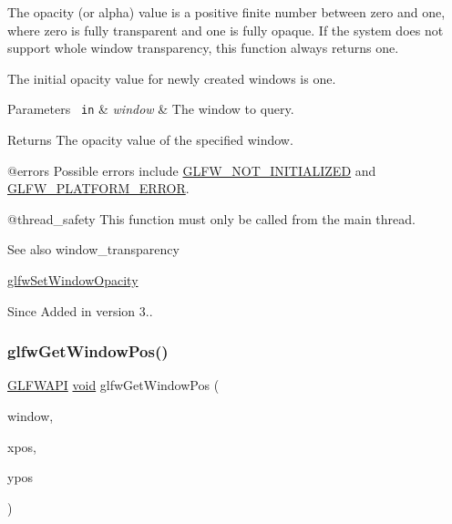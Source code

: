 The opacity (or alpha) value is a positive finite number between zero and one, where zero is fully transparent and one is fully opaque. If the system does not support whole window transparency, this function always returns one.

The initial opacity value for newly created windows is one.


\begin{DoxyParams}[1]{Parameters}
\mbox{\texttt{ in}}  & {\em window} & The window to query. \\
\hline
\end{DoxyParams}
\begin{DoxyReturn}{Returns}
The opacity value of the specified window.
\end{DoxyReturn}
@errors Possible errors include \mbox{\hyperlink{group__errors_ga2374ee02c177f12e1fa76ff3ed15e14a}{G\+L\+F\+W\+\_\+\+N\+O\+T\+\_\+\+I\+N\+I\+T\+I\+A\+L\+I\+Z\+ED}} and \mbox{\hyperlink{group__errors_gad44162d78100ea5e87cdd38426b8c7a1}{G\+L\+F\+W\+\_\+\+P\+L\+A\+T\+F\+O\+R\+M\+\_\+\+E\+R\+R\+OR}}.

@thread\+\_\+safety This function must only be called from the main thread.

\begin{DoxySeeAlso}{See also}
window\+\_\+transparency 

\mbox{\hyperlink{group__window_ga62a784fe328f227727cbcd0d07480ff3}{glfw\+Set\+Window\+Opacity}}
\end{DoxySeeAlso}
\begin{DoxySince}{Since}
Added in version 3.. 
\end{DoxySince}
\mbox{\label{group__window_ga0076a8591ef7494d359730cf2250b45b}} 
\subsubsection{\texorpdfstring{glfwGetWindowPos()}{glfwGetWindowPos()}}
{\footnotesize\ttfamily \mbox{\hyperlink{glfw3_8h_a56da5036b2cc259351ae22fd6439bb47}{G\+L\+F\+W\+A\+PI}} \mbox{\hyperlink{glad_8h_a950fc91edb4504f62f1c577bf4727c29}{void}} glfw\+Get\+Window\+Pos (\begin{DoxyParamCaption}\item[{\mbox{\hyperlink{group__window_ga3c96d80d363e67d13a41b5d1821f3242}{G\+L\+F\+Wwindow}} $\ast$}]{window,  }\item[{int $\ast$}]{xpos,  }\item[{int $\ast$}]{ypos }\end{DoxyParamCaption})}



